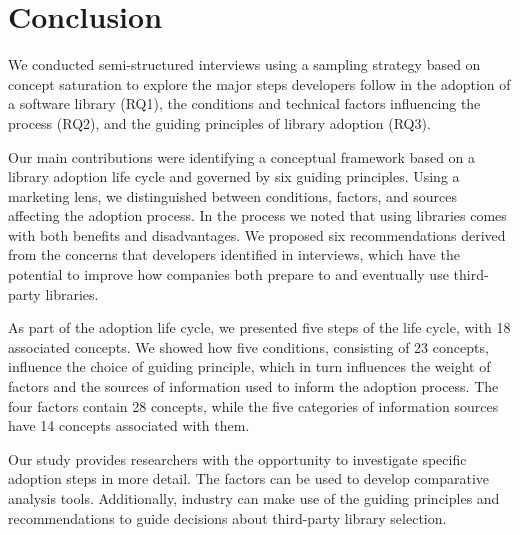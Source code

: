 
\section{Conclusion}

We conducted \numInterviews semi-structured interviews using a sampling strategy based on concept saturation to explore the major steps developers follow in the adoption of a software library (RQ1), the conditions and technical factors influencing the process (RQ2), and the guiding principles of library adoption (RQ3).

Our main contributions were identifying a conceptual framework based on a library adoption life cycle and governed by six guiding principles. Using a marketing lens, we distinguished between conditions, factors, and sources affecting the adoption process. In the process we noted that using libraries comes with both benefits and disadvantages. We proposed six recommendations derived from the concerns that developers identified in interviews, which have the potential to improve how companies both prepare to and eventually use third-party libraries.

As part of the adoption life cycle, we presented five steps of the life cycle, with 18 associated concepts. We showed how five conditions, consisting of 23 concepts, influence the choice of guiding principle, which in turn influences the weight of factors and the sources of information used to inform the adoption process. The four factors contain 28 concepts, while the five categories of information sources have 14 concepts associated with them.

Our study provides researchers with the opportunity to investigate specific adoption steps in more detail. The factors can be used to develop comparative analysis tools. Additionally, industry can make use of the guiding principles and recommendations to guide decisions about third-party library selection.




 


